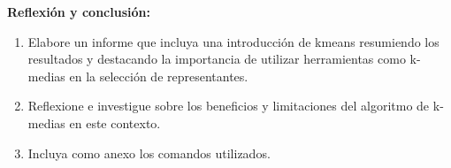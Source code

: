 \documentclass[12pt]{article}
\theoremstyle{exampstyle}
\theoremstyle{definition}
\theoremstyle{break}
\numberwithin{equation}{section}
\begin{document}
{\bf Reflexión y conclusión:}
\begin{enumerate}
    \item Elabore un informe que incluya una introducci\'on de kmeans resumiendo los resultados y destacando la importancia de utilizar herramientas como k-medias en la selección de representantes.
    \item Reflexione e investigue sobre los beneficios y limitaciones del algoritmo de k-medias en este contexto.
    \item Incluya como anexo los comandos utilizados.
\end{enumerate}
\end{document}
